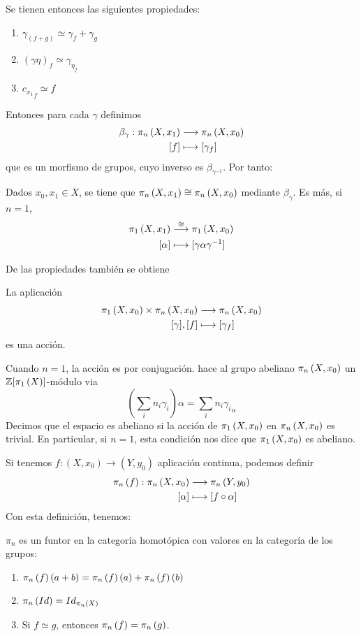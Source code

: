 Se tienen entonces las siguientes propiedades: \par
\begin{enumerate}
\item $\gamma_{(f+g)} \simeq \gamma_f + \gamma_g$
\item $(\gamma \eta)_f \simeq \gamma_{\eta_f}$
\item ${c_{x_1}}_f \simeq f$
\end{enumerate}
Entonces para cada $\gamma$ definimos
\begin{align*}
\beta_\gamma : \homot{n}{X, x_1} &\longrightarrow \homot{n}{X, x_0} \\
[f] &\longmapsto [\gamma_f]
\end{align*}
que es un morfismo de grupos, cuyo inverso es $\beta_{\gamma^{-1}}$. Por tanto:
\begin{teor}
Dados $x_0, x_1 \in X$, se tiene que $\pi_{n}\left(X, x_1\right) \cong \pi_{n}\left(X, x_0\right)$ mediante $\beta_\gamma$.
Es más, si $n=1$,
\begin{align*}
\homot{1}{X, x_1} &\stackrel{\cong}{\longrightarrow} \homot{1}{X, x_0} \\
[\alpha] &\longmapsto [\gamma \alpha \gamma^{-1}]
\end{align*}
\end{teor}
De las propiedades también se obtiene
\begin{teor}
La aplicación 
\begin{align*}
\homot{1}{X, x_0} \times \homot{n}{X, x_0} &\longrightarrow \homot{n}{X, x_0} \\
[\gamma], [f] &\longmapsto [\gamma_f]
\end{align*}
es una acción.
\end{teor}
Cuando $n = 1$, la acción es por conjugación. hace al grupo abeliano $\pi_{n}\left(X, x_0\right)$ un $\mathbb{Z}[\pi_{1}\left(X\right)]$-módulo via
\[
\left( \sum_i n_i \gamma_i \right) \alpha = \sum_i n_i {\gamma_i}_\alpha
\]
Decimos que el espacio es abeliano si la acción de $\pi_{1}\left(X, x_0\right)$ en $\pi_{n}\left(X, x_0\right)$ es trivial. En particular, si $n=1$, esta condición nos dice que $\pi_{1}\left(X, x_0\right)$ es abeliano. \par
Si tenemos $f : (X, x_0) \longrightarrow (Y, y_0)$ aplicación continua, podemos definir
\begin{align*}
\homot{n}{f} : \homot{n}{X, x_0} &\longrightarrow \homot{n}{Y, y_0} \\
[\alpha] & \longmapsto [f \circ \alpha]
\end{align*}
Con esta definición, tenemos:
\begin{prop}
$\pi_n$ es un funtor en la categoría homotópica con valores en la categoría de los grupos:
\begin{enumerate}
\item $\pi_{n}\left(f\right)(a+b) = \pi_{n}\left(f\right)(a) + \pi_{n}\left(f\right)(b)$
\item $\pi_{n}\left(Id\right) = Id_{\pi_{n}\left(X\right)}$
\item Si $f \simeq g$, entonces $\pi_{n}\left(f\right) = \pi_{n}\left(g\right)$.
\end{enumerate}
\end{prop}
